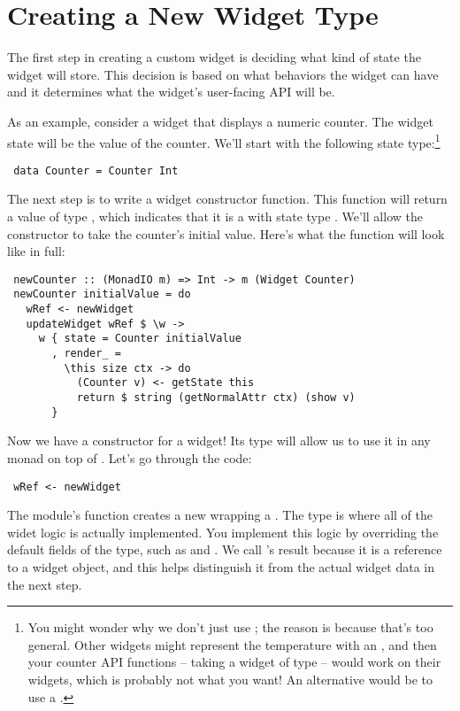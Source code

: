 \section{Creating a New Widget Type}
\label{sec:new_widget_type}

The first step in creating a custom widget is deciding what kind of
state the widget will store.  This decision is based on what behaviors
the widget can have and it determines what the widget's user-facing
API will be.

As an example, consider a widget that displays a numeric counter.  The
widget state will be the value of the counter.  We'll start with the
following state type:\footnote{You might wonder why we don't just use
  ; the reason is because that's too general.  Other widgets
  might represent the temperature with an , and then your
  counter API functions -- taking a widget of type  --
  would work on their widgets, which is probably not what you want!
  An alternative would be to use a .}

\begin{verbatim}
 data Counter = Counter Int
\end{verbatim}

The next step is to write a widget constructor function.  This
function will return a value of type , which
indicates that it is a  with state type .
We'll allow the constructor to take the counter's initial value.
Here's what the function will look like in full:

\begin{verbatim}
 newCounter :: (MonadIO m) => Int -> m (Widget Counter)
 newCounter initialValue = do
   wRef <- newWidget
   updateWidget wRef $ \w ->
     w { state = Counter initialValue
       , render_ =
         \this size ctx -> do
           (Counter v) <- getState this
           return $ string (getNormalAttr ctx) (show v)
       }
\end{verbatim}

Now we have a constructor for a  widget!  Its type will
allow us to use it in any monad on top of .  Let's go through
the code:

\begin{verbatim}
 wRef <- newWidget
\end{verbatim}

The  module's  function creates a new
 wrapping a .  The  type is
where all of the widet logic is actually implemented.  You implement
this logic by overriding the default fields of the 
type, such as  and .  We call 's
result  because it is a reference to a widget object, and
this helps distinguish it from the actual widget data in the next
step.


